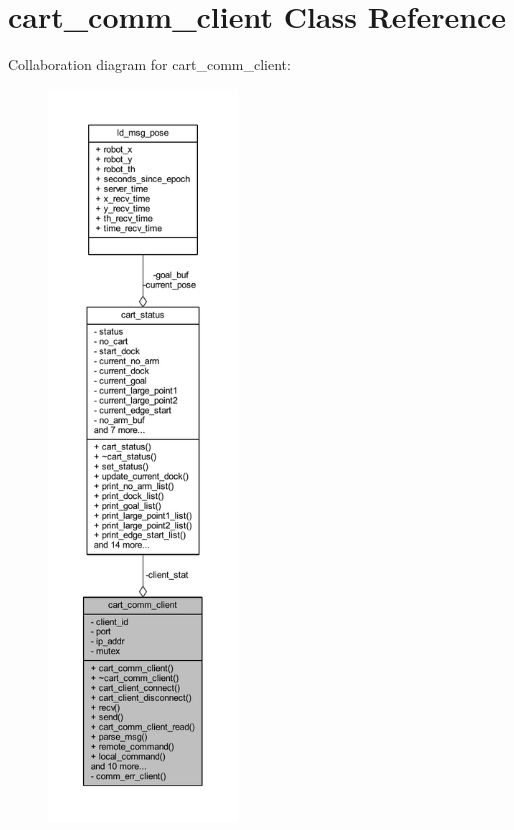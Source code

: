 \hypertarget{classcart__comm__client}{}\section{cart\+\_\+comm\+\_\+client Class Reference}
\label{classcart__comm__client}


Collaboration diagram for cart\+\_\+comm\+\_\+client\+:
\nopagebreak
\begin{figure}[H]
\begin{center}
\leavevmode
\includegraphics[height=550pt]{classcart__comm__client__coll__graph}
\end{center}
\end{figure}
